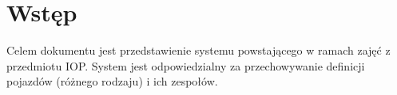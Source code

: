 \chapter{Wstęp}

Celem dokumentu jest przedstawienie systemu powstającego w ramach zajęć z przedmiotu IOP.
System jest odpowiedzialny za przechowywanie definicji pojazdów (różnego rodzaju) i ich zespołów.
